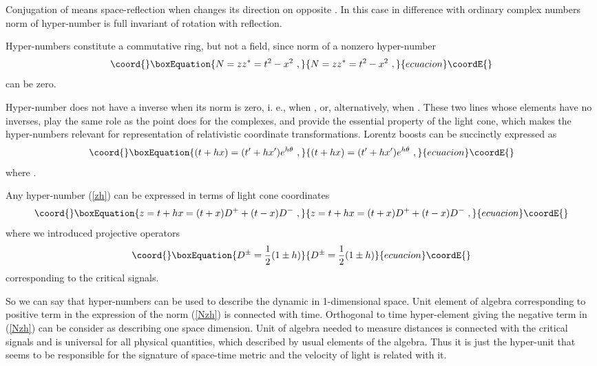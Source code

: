 \documentclass[a4paper,12pt]{article}
\begin{document}
Conjugation of \coordHE{} means space-reflection when \coordHE{} changes its direction on opposite 
\coordHE{}. In this case in difference with ordinary complex numbers norm of hyper-number 
is full invariant of rotation with reflection. 

Hyper-numbers constitute a commutative ring, but not a field, since norm of a nonzero
 hyper-number 
\begin{equation}\coord{}\boxEquation{ \label{Nzh}
N = zz^* = t^2 - x^2 ~, 
}{ N = zz^* = t^2 - x^2 ~, 
}{ecuacion}\coordE{}\end{equation}
can be zero. 

Hyper-number does not have a inverse when its norm is zero, i. e., when \coordHE{}, 
or, alternatively, when \coordHE{}. These two lines whose elements have no 
inverses, play the same role as the point \coordHE{} does for the complexes, and provide 
the essential property of the light cone, which makes the hyper-numbers relevant for 
representation of relativistic coordinate transformations. Lorentz boosts can be 
succinctly expressed as 
\begin{equation}\coord{}\boxEquation{ \label{lorentz}
(t + hx) = (t' + hx')e^{h\theta}~,
}{ (t + hx) = (t' + hx')e^{h\theta}~,
}{ecuacion}\coordE{}\end{equation}
where \coordHE{}.

Any hyper-number (\ref{zh}) can be expressed in terms of light cone coordinates
\begin{equation}\coord{}\boxEquation{ \label{zhDec}
z = t +hx = (t + x)D^+ + (t - x)D^- ~,
}{ z = t +hx = (t + x)D^+ + (t - x)D^- ~,
}{ecuacion}\coordE{}\end{equation}
where we introduced projective operators
\begin{equation}\coord{}\boxEquation{ \label{Dzh}
D^\pm = \frac{1}{2}(1 \pm h) 
}{ D^\pm = \frac{1}{2}(1 \pm h) 
}{ecuacion}\coordE{}\end{equation}
corresponding to the critical signals.

So we can say that hyper-numbers can be used to describe the dynamic in 1-dimensional 
space. Unit element of algebra corresponding to positive term in the expression of the 
norm (\ref{Nzh}) is connected with time. Orthogonal to time hyper-element giving the 
negative term in (\ref{Nzh}) can be consider as describing one space dimension. Unit 
of algebra needed to measure distances is connected with the critical signals and is 
universal for all physical quantities, which described by usual elements of the algebra. 
Thus it is just the hyper-unit that seems to be responsible for the signature of 
space-time metric and the velocity of light \coordHE{} is related with it.
\end{document}
